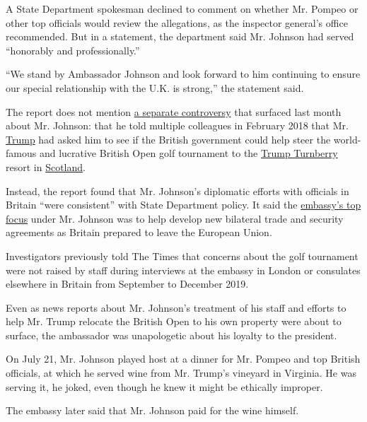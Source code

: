 A State Department spokesman declined to comment on whether Mr. Pompeo
or other top officials would review the allegations, as the inspector
general's office recommended. But in a statement, the department said
Mr. Johnson had served ``honorably and professionally.''

``We stand by Ambassador Johnson and look forward to him continuing to
ensure our special relationship with the U.K. is strong,'' the statement
said.

The report does not mention
\href{https://www.nytimes3xbfgragh.onion/2020/07/21/world/europe/trump-british-open.html}{a
separate controversy} that surfaced last month about Mr. Johnson: that
he told multiple colleagues in February 2018 that Mr.
\href{https://www.nytimes3xbfgragh.onion/2020/07/22/us/politics/trump-turnberry-british-open.html}{Trump}
had asked him to see if the British government could help steer the
world-famous and lucrative British Open golf tournament to the
\href{https://www.nytimes3xbfgragh.onion/2020/07/22/us/politics/trump-turnberry-british-open.html}{Trump
Turnberry} resort in
\href{https://www.nytimes3xbfgragh.onion/2020/07/22/us/politics/trump-turnberry-british-open.html}{Scotland}.

Instead, the report found that Mr. Johnson's diplomatic efforts with
officials in Britain ``were consistent'' with State Department policy.
It said the
\href{https://www.state.gov/wp-content/uploads/2019/06/ICS-United-Kingdom_UNCLASS-508.pdf}{embassy's
top focus} under Mr. Johnson was to help develop new bilateral trade and
security agreements as Britain prepared to leave the European Union.

Investigators previously told The Times that concerns about the golf
tournament were not raised by staff during interviews at the embassy in
London or consulates elsewhere in Britain from September to December
2019.

Even as news reports about Mr. Johnson's treatment of his staff and
efforts to help Mr. Trump relocate the British Open to his own property
were about to surface, the ambassador was unapologetic about his loyalty
to the president.

On July 21, Mr. Johnson played host at a dinner for Mr. Pompeo and top
British officials, at which he served wine from Mr. Trump's vineyard in
Virginia. He was serving it, he joked, even though he knew it might be
ethically improper.

The embassy later said that Mr. Johnson paid for the wine himself.

